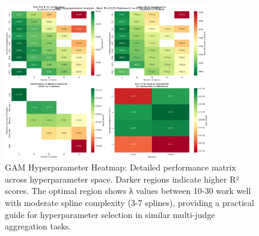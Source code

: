 \begin{figure}[htbp]
    \centering
    \includegraphics[width=0.8\textwidth]{results/full_experiments/baseline_ultrafeedback_2000samples_20250816_213023/gam_analysis/gam_tuning_run_20250818_142018/gam_hyperparameter_heatmap.png}
    \caption{GAM Hyperparameter Heatmap: Detailed performance matrix across hyperparameter space. Darker regions indicate higher R² scores. The optimal region shows λ values between 10-30 work well with moderate spline complexity (3-7 splines), providing a practical guide for hyperparameter selection in similar multi-judge aggregation tasks.}
    \label{fig:gam_hyperparameter_heatmap}
\end{figure}

